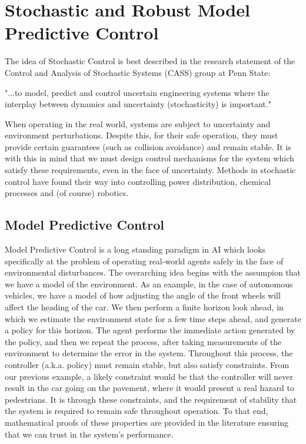 \documentclass[preprint,11pt]{report}
\begin{document}
\section{Stochastic and Robust Model Predictive Control}

The idea of Stochastic Control is best described in the research statement of the Control and
Analysis of Stochastic Systems (CASS) group at Penn State:

\begin{displayquote}
	"...to model, predict and control uncertain engineering systems where the interplay between
	dynamics and uncertainty (stochasticity) is important."
\end{displayquote}

When operating in the real world, systems are subject to uncertainty and environment perturbations.
Despite this, for their safe operation, they must provide certain guarantees (such as collision
avoidance) and remain stable. It is with this in mind that we must design control mechanisms for the
system which satisfy these requirements, even in the face of uncertainty. Methods in stochastic
control have found their way into controlling power distribution, chemical processes and (of course)
robotics. 

\subsection*{Model Predictive Control}

Model Predictive Control is a long standing paradigm in AI which looks specifically at the problem
of operating real-world agents safely in the face of environmental disturbances. The overarching
idea begins with the assumpion that we have a model of the environment. As an example, in
the case of autonomous vehicles, we have a model of how adjusting the angle of the front wheels will
affect the heading of the car. We then perform a finite horizon look ahead, in which we estimate the
environment state for a few time steps ahead, and generate a policy for this horizon. The agent
performs the immediate action generated by the policy, and then we repeat the process, after taking
measurements of the environment to determine the error in the system. Throughout this process, the
controller (a.k.a. policy) must remain stable, but also satisfy constraints. From our previous
example, a likely constraint would be that the controller will never result in the car going on the
pavement, where it would present a real hazard to pedestrians. It is through these constraints, and
the requirement of stability that the system is required to remain safe throughout operation. To
that end, mathematical proofs of these properties are provided in the literature ensuring that we
can trust in the system's performance.
\end{document}
